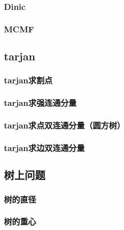 \documentclass[10pt,a4paper]{article}
\begin{document}
\subsubsection{Dinic}

\subsubsection{MCMF}

\subsection{tarjan}
\subsubsection{tarjan求割点}
\begin{spacing}{1.5}

\end{spacing}

\subsubsection{tarjan求强连通分量}
\begin{spacing}{1.5}

\end{spacing}

\subsubsection{tarjan求点双连通分量（圆方树）}

\subsubsection{tarjan求边双连通分量}
\begin{spacing}{1.5}

\end{spacing}

\subsection{树上问题}
\subsubsection{树的直径}

\subsubsection{树的重心}

\end{document}
